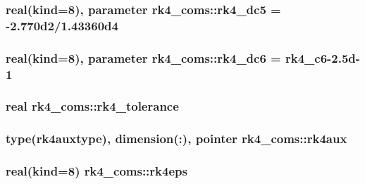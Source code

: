 \subsubsection[{rk4\+\_\+dc5}]{\setlength{\rightskip}{0pt plus 5cm}real(kind=8), parameter rk4\+\_\+coms\+::rk4\+\_\+dc5 = -\/2.\+770d2/1.\+43360d4}\label{namespacerk4__coms_aa2ab2d5fa0e976ca56e10da08c4409a6}
\hypertarget{namespacerk4__coms_abf3a30685db4e4c9f6cd9f903eb1a2fd}{}
\subsubsection[{rk4\+\_\+dc6}]{\setlength{\rightskip}{0pt plus 5cm}real(kind=8), parameter rk4\+\_\+coms\+::rk4\+\_\+dc6 = {\bf rk4\+\_\+c6}-\/2.\+5d-\/1}\label{namespacerk4__coms_abf3a30685db4e4c9f6cd9f903eb1a2fd}
\hypertarget{namespacerk4__coms_ab839ff31cd3abc7dd1fd40e4d3983a31}{}
\subsubsection[{rk4\+\_\+tolerance}]{\setlength{\rightskip}{0pt plus 5cm}real rk4\+\_\+coms\+::rk4\+\_\+tolerance}\label{namespacerk4__coms_ab839ff31cd3abc7dd1fd40e4d3983a31}
\hypertarget{namespacerk4__coms_af06182f853d5a71c46e249e55fe5a678}{}
\subsubsection[{rk4aux}]{\setlength{\rightskip}{0pt plus 5cm}type({\bf rk4auxtype}), dimension(\+:), pointer rk4\+\_\+coms\+::rk4aux}\label{namespacerk4__coms_af06182f853d5a71c46e249e55fe5a678}
\hypertarget{namespacerk4__coms_aa154e17784b65f05a89af9b4f86bb879}{}
\subsubsection[{rk4eps}]{\setlength{\rightskip}{0pt plus 5cm}real(kind=8) rk4\+\_\+coms\+::rk4eps}\label{namespacerk4__coms_aa154e17784b65f05a89af9b4f86bb879}
\hypertarget{namespacerk4__coms_a2b1484b3befa3c0d446279fa4001a56d}{}
